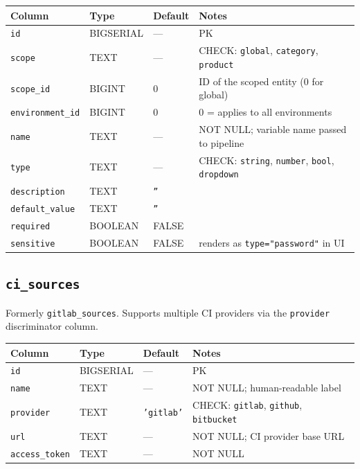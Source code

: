 \documentclass[12pt,a4paper,twoside]{report}
\newcommand{\code}[1]{\texttt{#1}}
\begin{document}
\begin{table}[H]
  \centering\small
  \begin{tabular}{@{}llll@{}}
    \toprule
    \textbf{Column} & \textbf{Type} & \textbf{Default} & \textbf{Notes} \\
    \midrule
    \code{id}             & BIGSERIAL & --- & PK \\
    \code{scope}          & TEXT      & --- & CHECK: \code{global}, \code{category}, \code{product} \\
    \code{scope\_id}      & BIGINT    & 0   & ID of the scoped entity (0 for global) \\
    \code{environment\_id}& BIGINT    & 0   & 0 = applies to all environments \\
    \code{name}           & TEXT      & --- & NOT NULL; variable name passed to pipeline \\
    \code{type}           & TEXT      & --- & CHECK: \code{string}, \code{number}, \code{bool}, \code{dropdown} \\
    \code{description}    & TEXT      & \code{''} & \\
    \code{default\_value} & TEXT      & \code{''} & \\
    \code{required}       & BOOLEAN   & FALSE & \\
    \code{sensitive}      & BOOLEAN   & FALSE & renders as \code{type="password"} in UI \\
    \bottomrule
  \end{tabular}
\end{table}

\subsection*{\texttt{ci\_sources}}

Formerly \code{gitlab\_sources}. Supports multiple CI providers via the
\code{provider} discriminator column.

\begin{table}[H]
  \centering\small
  \begin{tabular}{@{}llll@{}}
    \toprule
    \textbf{Column} & \textbf{Type} & \textbf{Default} & \textbf{Notes} \\
    \midrule
    \code{id}           & BIGSERIAL & ---              & PK \\
    \code{name}         & TEXT      & ---              & NOT NULL; human-readable label \\
    \code{provider}     & TEXT      & \code{'gitlab'}  & CHECK: \code{gitlab}, \code{github}, \code{bitbucket} \\
    \code{url}          & TEXT      & ---              & NOT NULL; CI provider base URL \\
    \code{access\_token}& TEXT      & ---              & NOT NULL \\
    \bottomrule
  \end{tabular}
\end{table}
\end{document}

